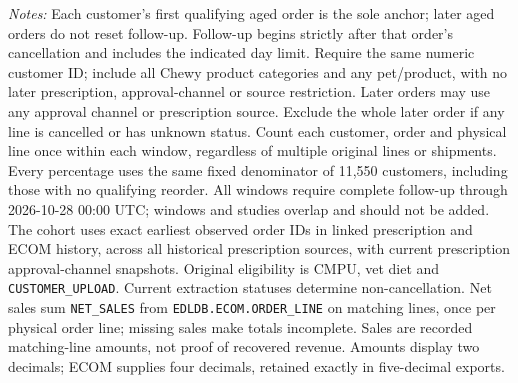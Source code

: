 \begin{table}[!htbp]
\begin{minipage}{\linewidth}
\footnotesize
\textit{Notes:} Each customer's first qualifying aged order is the sole anchor;
later aged orders do not reset follow-up. Follow-up begins strictly after that
order's cancellation and includes the indicated day limit. Require the same numeric customer ID; include all Chewy product categories and any pet/product, with no later prescription, approval-channel or source restriction. Later orders may use any approval channel or prescription
source. Exclude the whole later order if any line is cancelled or has unknown
status. Count each customer, order and physical line once within each window,
regardless of multiple original lines or shipments. Every percentage uses the
same fixed denominator of 11,550 customers, including those with no
qualifying reorder. All windows require complete follow-up through
2026-10-28 00:00 UTC; windows and studies overlap and should not be added.
The cohort uses exact earliest observed order IDs in linked prescription and
ECOM history, across all historical prescription sources, with current
prescription approval-channel snapshots. Original eligibility is CMPU,
vet diet and \texttt{CUSTOMER\_UPLOAD}. Current extraction statuses determine
non-cancellation. Net sales sum \texttt{NET\_SALES} from \texttt{EDLDB.ECOM.ORDER\_LINE} on matching
lines, once per physical order line; missing sales make totals incomplete.
Sales are recorded matching-line amounts, not proof of recovered revenue.
Amounts display two decimals; ECOM supplies four decimals, retained exactly in five-decimal exports.
\end{minipage}
\end{table}
